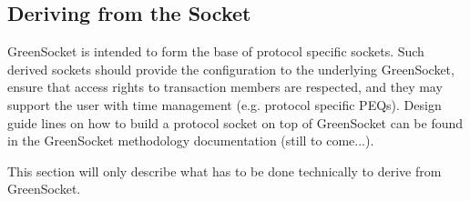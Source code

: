 \documentclass[a4paper,10pt]{article}          %
\begin{document}

\subsection{Deriving from the Socket}

GreenSocket is intended to form the base of protocol specific sockets. Such derived sockets should provide the configuration to the underlying GreenSocket, ensure that access rights to transaction members are respected, and they may support the user with time management (e.g. protocol specific PEQs). Design guide lines on how to build a protocol socket on top of GreenSocket can be found in the GreenSocket methodology documentation (still to come...).

This section will only describe what has to be done technically to derive from GreenSocket.
\end{document}
